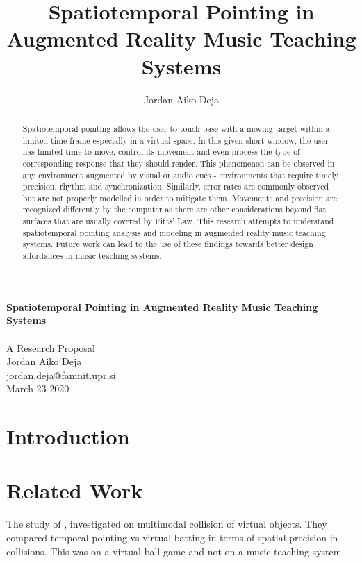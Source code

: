 \documentclass{article}
\title{Spatiotemporal Pointing in Augmented Reality Music Teaching Systems}
\author{Jordan Aiko Deja}
\begin{document}
\begin{center}
\large \textbf{Spatiotemporal Pointing in Augmented Reality Music Teaching Systems}
\\            
\vspace{0.5cm}\\
A Research Proposal\\
\vspace{0.5cm}
Jordan Aiko Deja\\
jordan.deja@famnit.upr.si\\
\vspace{0.5cm}
March 23 2020
\vspace{0.5cm}
\end{center}

\begin{abstract}
     Spatiotemporal pointing allows the user to touch base with a moving target within a limited time frame especially in a virtual space. In this given short window, the user has limited time to move, control its movement and even process the type of corresponding response that they should render. This phenomenon can be observed in any environment augmented by visual or audio cues - environments that require timely precision, rhythm and synchronization. Similarly, error rates are commonly observed but are not properly modelled in order to mitigate them. Movements and precision are recognized differently by the computer as there are other considerations beyond flat surfaces that are usually covered by Fitts' Law. This research attempts to understand spatiotemporal pointing analysis and modeling in augmented reality music teaching systems. Future work can lead to the use of these findings towards better design affordances in music teaching systems. 
\end{abstract}


\section{Introduction}
\section{Related Work}
The study of \cite{lee2017boxer}, investigated on multimodal collision of virtual objects. They compared temporal pointing vs virtual batting in terms of spatial precision in collisions. This was on a virtual ball game and not on a music teaching system. 
\end{document}
